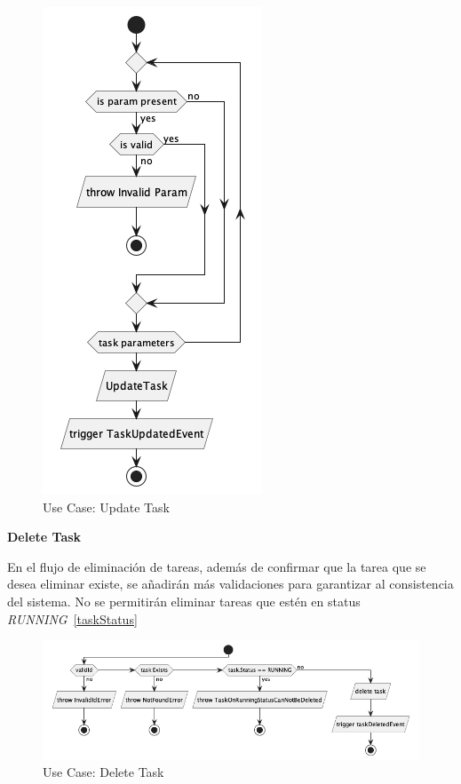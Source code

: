 \begin{figure}[H]
    \centering
    \includegraphics[height=0.4\textheight]{./part/Proyecto_ejecutivo/memoria_descriptiva/descripcionDelProyecto/manager/uml/updateTaskUseCase}
    \caption{Use Case: Update Task}\label{fig:Use Case-Update Task}
\end{figure}

\textbf{Delete Task}

En el flujo de eliminación de tareas, además de confirmar que la tarea que se desea eliminar existe, se añadirán más validaciones para garantizar al consistencia del sistema. No se permitirán eliminar tareas que estén en status \textit{RUNNING}~\cref{taskStatus}

\begin{figure}[H]
    \centering
    \includegraphics[height=0.2\textheight]{./part/Proyecto_ejecutivo/memoria_descriptiva/descripcionDelProyecto/manager/uml/deleteTaskUseCase}
    \caption{Use Case: Delete Task}\label{fig:Use Case-Delete Task}
\end{figure}

